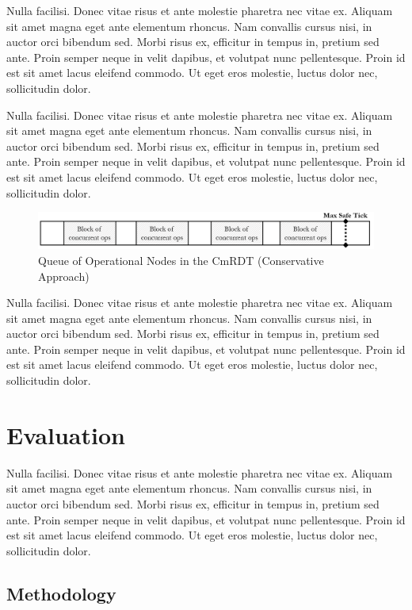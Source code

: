 \documentclass[sigconf,nonacm,11pt]{acmart}
\begin{document}
Nulla facilisi. Donec vitae risus et ante molestie pharetra nec vitae ex. Aliquam sit amet magna eget ante elementum rhoncus. Nam convallis cursus nisi, in auctor orci bibendum sed. Morbi risus ex, efficitur in tempus in, pretium sed ante. Proin semper neque in velit dapibus, et volutpat nunc pellentesque. Proin id est sit amet lacus eleifend commodo. Ut eget eros molestie, luctus dolor nec, sollicitudin dolor.

Nulla facilisi. Donec vitae risus et ante molestie pharetra nec vitae ex. Aliquam sit amet magna eget ante elementum rhoncus. Nam convallis cursus nisi, in auctor orci bibendum sed. Morbi risus ex, efficitur in tempus in, pretium sed ante. Proin semper neque in velit dapibus, et volutpat nunc pellentesque. Proin id est sit amet lacus eleifend commodo. Ut eget eros molestie, luctus dolor nec, sollicitudin dolor.

\begin{figure}[h]
  \centering
  \includegraphics[width=15.5cm]{Fig6CmRDTQ2}
  \caption{Queue of Operational Nodes in the CmRDT (Conservative Approach)}
  \label{fig:cmrdtq2}
\end{figure}

Nulla facilisi. Donec vitae risus et ante molestie pharetra nec vitae ex. Aliquam sit amet magna eget ante elementum rhoncus. Nam convallis cursus nisi, in auctor orci bibendum sed. Morbi risus ex, efficitur in tempus in, pretium sed ante. Proin semper neque in velit dapibus, et volutpat nunc pellentesque. Proin id est sit amet lacus eleifend commodo. Ut eget eros molestie, luctus dolor nec, sollicitudin dolor.

\section{Evaluation}

Nulla facilisi. Donec vitae risus et ante molestie pharetra nec vitae ex. Aliquam sit amet magna eget ante elementum rhoncus. Nam convallis cursus nisi, in auctor orci bibendum sed. Morbi risus ex, efficitur in tempus in, pretium sed ante. Proin semper neque in velit dapibus, et volutpat nunc pellentesque. Proin id est sit amet lacus eleifend commodo. Ut eget eros molestie, luctus dolor nec, sollicitudin dolor.

\subsection{Methodology}
\end{document}
